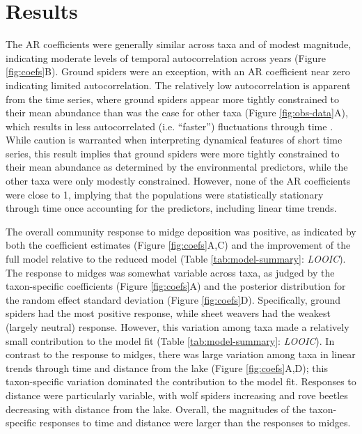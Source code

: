 \section*{Results}

The AR coefficients were generally similar across taxa and of modest magnitude,
indicating moderate levels of temporal autocorrelation across years
(Figure \ref{fig:coefs}B).
Ground spiders were an exception,
with an AR coefficient near zero indicating limited autocorrelation.
The relatively low autocorrelation is apparent from the time series,
where ground spiders appear more tightly constrained to their mean abundance
than was the case for other taxa (Figure \ref{fig:obs-data}A),
which results in less autocorrelated (i.e. ``faster'') fluctuations through time
\citep{Ziebarth2010}. 
While caution is warranted when interpreting dynamical features of short time series,
this result implies that ground spiders were more tightly constrained to their mean abundance
as determined by the environmental predictors, while the other taxa were only modestly constrained.
However, none of the AR coefficients were close to 1, 
implying that the populations were statistically stationary through time 
once accounting for the predictors, including linear time trends.



The overall community response to midge deposition was positive,
as indicated by both the coefficient estimates (Figure \ref{fig:coefs}A,C)
and the improvement of the full model
relative to the reduced model (Table \ref{tab:model-summary}: \emph{LOOIC}).
The response to midges was somewhat variable across taxa,
as judged by the taxon-specific coefficients (Figure \ref{fig:coefs}A)
and the posterior distribution
for the random effect standard deviation (Figure \ref{fig:coefs}D).
Specifically, ground spiders had the most positive response,
while sheet weavers had the weakest (largely neutral) response.  
However, this variation among taxa made a relatively small contribution
to the model fit (Table \ref{tab:model-summary}: \emph{LOOIC}).
In contrast to the response to midges, there was large variation among taxa in
linear trends through time and distance from the lake (Figure \ref{fig:coefs}A,D);
this taxon-specific variation dominated the contribution to the model fit.
Responses to distance were particularly variable, with wolf spiders 
increasing and rove beetles decreasing with distance from the lake.
Overall, the magnitudes of the taxon-specific responses to time and distance
were larger than the responses to midges.




